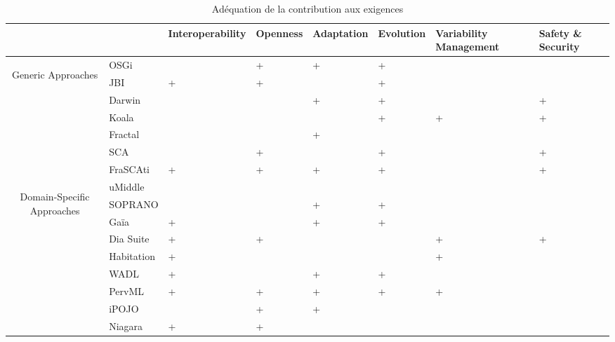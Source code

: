 \begin{table}[h!]
\begin{tabular}{cm{}|| >{\centering\arraybackslash}m{}| >{\centering\arraybackslash}m{}| >{\centering\arraybackslash}m{}| >{\centering\arraybackslash}m{}| >{\centering}m{}| >{\centering\arraybackslash}m{}|}
 & & {\tiny Interoperability} & {\tiny Openness} & {\tiny Adaptation} & {\tiny Evolution} & {\tiny Variability Management} & {\tiny Safety \& Security}\\
 \hline\hline
 \multirow{7}{8mm}{\begin{sideways}\parbox{25mm}{\centering Generic Approaches}\end{sideways}}
 &{\small OSGi} 		&  & + & + & + &  &  \\ 
 &{\small JBI} 			& + & + &  & + &  &  \\
 \cline{2-8}%
 &{\small Darwin} 		&  &  & + & + &   & + \\ 
 &{\small Koala} 		&  &  &   & + & + & + \\
 &{\small Fractal} 		&  &  & + &   &   &  \\
 \cline{2-8}%
 &{\small SCA} 			&   & + &  & + &  & +\\
 &{\small FraSCAti}     & + & + & + & + &  & + \\
 \hline\hline
 \multirow{9}{8mm}{\begin{sideways}\parbox{30mm}{\centering  Domain-Specific Approaches}\end{sideways}} 
 &{\small uMiddle} 		&  &  &  &  &  &  \\
 &{\small SOPRANO} 		&  &  & + & + &  &  \\
 &{\small Ga\"ia} 		& + &  & + & + &  &  \\
 &{\small Dia Suite} 	& + & + &  &  & + & + \\
 &{\small Habitation} 	& + &  &  &  & + &  \\
 &{\small WADL} 		& + &  & + & + &  &  \\
 &{\small PervML} 		& + & + & + & + & + &  \\
 &{\small iPOJO} 		&  & + & + &  &  &  \\
 &{\small Niagara} 		& + & + &  &  &  &  \\
 \hline
\end{tabular}
\caption{Adéquation de la contribution aux exigences}
\label{tab:adequatnessFr}
\end{table}


